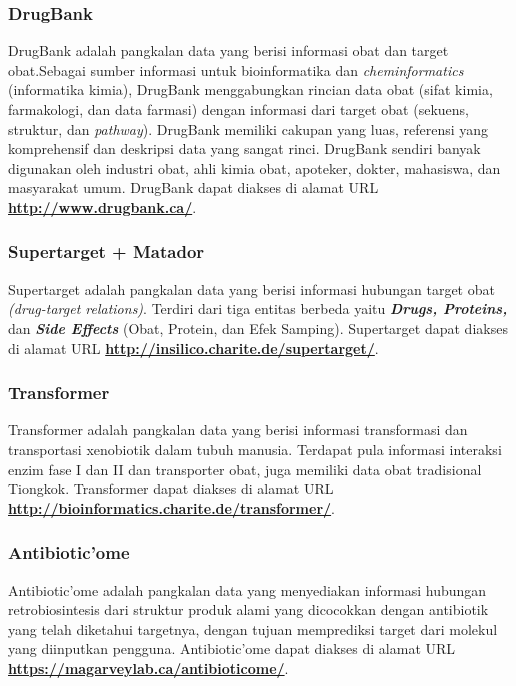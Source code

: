 		\subsubsection{DrugBank} \label{drugbank}
		DrugBank adalah pangkalan data yang berisi informasi obat dan target obat.Sebagai sumber informasi untuk bioinformatika dan \emph{cheminformatics} (informatika kimia), DrugBank menggabungkan rincian data obat (sifat kimia, farmakologi, dan data farmasi) dengan informasi dari target obat (sekuens, struktur, dan \emph{pathway}). DrugBank memiliki cakupan yang luas, referensi yang komprehensif dan deskripsi data yang sangat rinci. DrugBank sendiri banyak digunakan oleh industri obat, ahli kimia obat, apoteker, dokter, mahasiswa, dan masyarakat umum. DrugBank dapat diakses di alamat URL \textbf{\url{http://www.drugbank.ca/}}.

		\subsubsection{Supertarget + Matador} \label{supertarget}
		Supertarget adalah pangkalan data yang berisi informasi hubungan target obat \emph{(drug-target relations)}. Terdiri dari tiga entitas berbeda yaitu \textbf{\emph{Drugs, Proteins,}} dan \textbf{\emph{Side Effects}} (Obat, Protein, dan Efek Samping). Supertarget dapat diakses di alamat URL \textbf{\url{http://insilico.charite.de/supertarget/}}.

		\subsubsection{Transformer} \label{transformer}
		Transformer adalah pangkalan data yang berisi informasi transformasi dan transportasi xenobiotik dalam tubuh manusia. Terdapat pula informasi interaksi enzim fase I dan II dan transporter obat, juga memiliki data obat tradisional Tiongkok. Transformer dapat diakses di alamat URL \textbf{\url{http://bioinformatics.charite.de/transformer/}}.

		\subsubsection{Antibiotic'ome} \label{antibioticome}
		Antibiotic'ome adalah pangkalan data yang menyediakan informasi hubungan retrobiosintesis dari struktur produk alami yang dicocokkan dengan antibiotik yang telah diketahui targetnya, dengan tujuan memprediksi target dari molekul yang diinputkan pengguna. Antibiotic'ome dapat diakses di alamat URL \textbf{\url{https://magarveylab.ca/antibioticome/}}.

